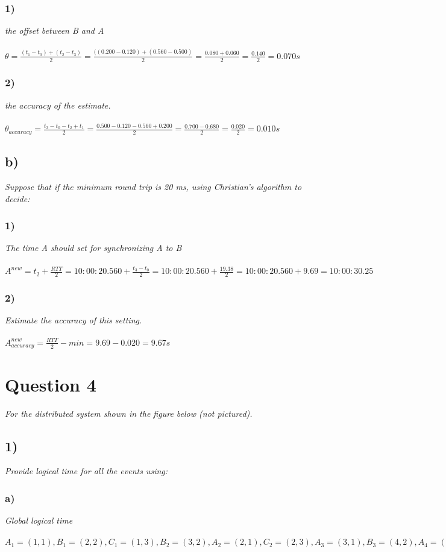 \documentclass[a4paper, titlepage,12pt]{article}
\begin{document}
	\subsubsection*{1)} \emph{the offset between B and A}
\\\\
	$\theta = \frac{(t_1 - t_0) + (t_2 - t_3)}{2} = \frac{((0.200 - 0.120) + (0.560 - 0.500)}{2} = \frac{0.080 + 0.060}{2} = \frac{0.140}{2} = 0.070s$
	\subsubsection*{2)} \emph{the accuracy of the estimate.}
\\\\
	$\theta_{accuracy} = \frac{t_3 - t_0 - t_2 + t_1}{2} = \frac{0.500 - 0.120 - 0.560 + 0.200}{2} = \frac{0.700 - 0.680}{2} = \frac{0.020}{2} = 0.010s$
	\subsection*{b)}
	\emph{Suppose that if the minimum round trip is 20 ms, using Christian's algorithm to decide:}
	\subsubsection*{1)} \emph{The time A should set for synchronizing A to B}
\\\\
	$A^{new} = t_2 + \frac{RTT}{2} = 10:00:20.560 + \frac{t_3 - t_0}{2} = 10:00:20.560 + \frac{19.38}{2} = 10:00:20.560 + 9.69 = 10:00:30.25$
	\subsubsection*{2)} \emph{Estimate the accuracy of this setting.}
\\\\
	$A^{new}_{accuracy} = \frac{RTT}{2} - min = 9.69 - 0.020 = 9.67s$

	\section*{Question 4}
	\emph{For the distributed system shown in the figure below (not pictured).}
	\subsection*{1)}
	\emph{Provide logical time for all the events using:}
	\subsubsection*{a)} 
	\emph{Global logical time}
\\\\
	$A_1 = (1, 1), B_1 = (2, 2), C_1 = (1, 3), B_2 = (3, 2), A_2 = (2, 1), C_2 = (2, 3), A_3 = (3, 1), B_3 = (4, 2), A_4 = (4, 1), C_3 = (5, 3), B_4 = (5, 2), C_4 = (6, 3)$
\end{document}

